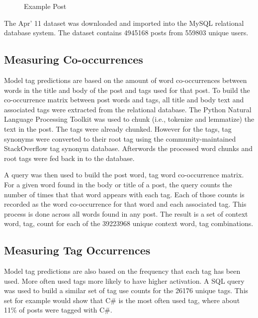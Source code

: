 \documentclass[10pt,letterpaper]{article}
\begin{document}
\begin{figure}[ht]
  \centering
  \caption{Example Post}
  \label{fig:examplePost}
\end{figure}

The Apr' 11 dataset \cite{DataDump2011} was downloaded and imported into the MySQL relational database system.
The dataset contains \num{4945168} posts from \num{559803} unique users.

\subsection{Measuring Co-occurrences}

Model tag predictions are based on the amount of word co-occurrences between words in the title and body of the post and tags used for that post.
To build the co-occurrence matrix between post words and tags, all title and body text and associated tags were extracted from the relational database.
The Python Natural Language Processing Toolkit \cite{Bird2009} was used to chunk (i.e., tokenize and lemmatize) the text in the post.
The tags were already chunked.
However for the tags, tag synonyms were converted to their root tag using the community-maintained StackOverflow tag synonym database.
Afterwords the processed word chunks and root tags were fed back in to the database.

A query was then used to build the post word, tag word co-occurrence matrix.
For a given word found in the body or title of a post, the query counts the number of times that that word appears with each tag.
Each of those counts is recorded as the word co-occurrence for that word and each associated tag.
This process is done across all words found in any post.
The result is a set of context word, tag, count for each of the \num{39223968} unique context word, tag combinations.

\subsection{Measuring Tag Occurrences}

Model tag predictions are also based on the frequency that each tag has been used.
More often used tags more likely to have higher activation.
A SQL query was used to build a similar set of tag use counts for the \num{26176} unique tags.
This set for example would show that C\# is the most often used tag, where about 11\% of posts were tagged with C\#.
\end{document}
